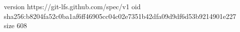 version https://git-lfs.github.com/spec/v1
oid sha256:b8204fa52c0ba1af6ff46905cc04c02e7351b42dfa09d9df6d53b9214901e227
size 608
